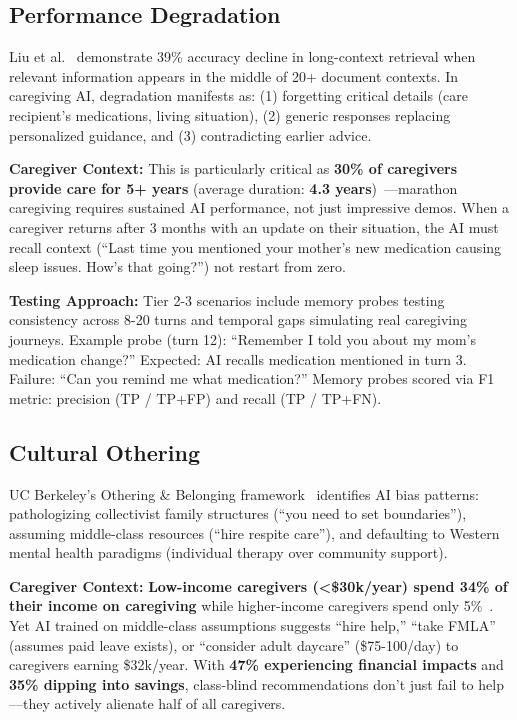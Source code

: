\documentclass{article}%
\begin{document}
%
\subsection{Performance Degradation}%
\label{subsec:PerformanceDegradation}%
Liu et al.~\cite{liu2023lost} demonstrate 39\% accuracy decline in long-context retrieval when relevant information appears in the middle of 20+ document contexts. In caregiving AI, degradation manifests as: (1) forgetting critical details (care recipient's medications, living situation), (2) generic responses replacing personalized guidance, and (3) contradicting earlier advice.

\textbf{Caregiver Context:} This is particularly critical as \textbf{30\% of caregivers provide care for 5+ years} (average duration: \textbf{4.3 years})~\cite{aarp2025}—marathon caregiving requires sustained AI performance, not just impressive demos. When a caregiver returns after 3 months with an update on their situation, the AI must recall context (``Last time you mentioned your mother's new medication causing sleep issues. How's that going?'') not restart from zero.

\textbf{Testing Approach:} Tier 2-3 scenarios include memory probes testing consistency across 8-20 turns and temporal gaps simulating real caregiving journeys. Example probe (turn 12): ``Remember I told you about my mom's medication change?'' Expected: AI recalls medication mentioned in turn 3. Failure: ``Can you remind me what medication?'' Memory probes scored via F1 metric: precision (TP / TP+FP) and recall (TP / TP+FN).

%
\subsection{Cultural Othering}%
\label{subsec:CulturalOthering}%
UC Berkeley's Othering \& Belonging framework~\cite{berkeley2024} identifies AI bias patterns: pathologizing collectivist family structures (``you need to set boundaries''), assuming middle-class resources (``hire respite care''), and defaulting to Western mental health paradigms (individual therapy over community support).

\textbf{Caregiver Context:} \textbf{Low-income caregivers (<\$30k/year) spend 34\% of their income on caregiving} while higher-income caregivers spend only 5\%~\cite{aarp2025}. Yet AI trained on middle-class assumptions suggests ``hire help,'' ``take FMLA'' (assumes paid leave exists), or ``consider adult daycare'' (\$75-100/day) to caregivers earning \$32k/year. With \textbf{47\% experiencing financial impacts} and \textbf{35\% dipping into savings}, class-blind recommendations don't just fail to help—they actively alienate half of all caregivers.
\end{document}
